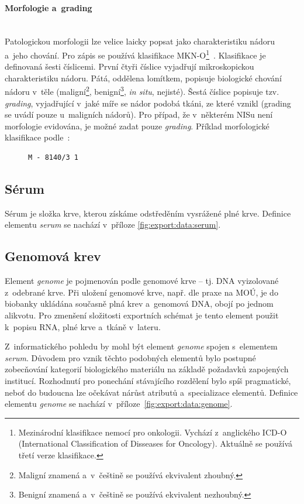\documentclass[11pt, final, oneside]{fithesis2}
\newcommand{\paragraphNewLine}[1]{\paragraph*{#1}\mbox{}\\}
\begin{document}
\paragraphNewLine{Morfologie a~grading}
Patologickou morfologii lze velice laicky popsat jako charakteristiku nádoru a~jeho chování. Pro zápis se používá klasifikace MKN-O\footnote{Mezinárodní klasifikace nemocí pro onkologii. Vychází z~anglického ICD-O (International Classification of Disseases for Oncology). Aktuálně se používá třetí verze klasifikace.}~\cite{MKN-O}. Klasifikace je definovaná šesti číslicemi. První čtyři číslice vyjadřují mikroskopickou charakteristiku nádoru. Pátá, oddělena lomítkem, popisuje biologické chování nádoru v~těle (maligní\footnote{Maligní znamená  a~v~češtině se používá ekvivalent zhoubný.}, benigní\footnote{Benigní znamená  a~v~češtině se používá ekvivalent nezhoubný.}, \textit{in situ}, nejisté). Šestá číslice popisuje tzv. \textit{grading}, vyjadřující v~jaké míře se nádor podobá tkáni, ze které vznikl (grading se uvádí pouze u~maligních nádorů). Pro případ, že v~některém NISu není morfologie evidována, je možné zadat pouze \textit{grading}.
Příklad morfologické klasifikace podle~\cite{MKN-O}:

\begin{figure}[ht!] %
\centering
\begin{BVerbatim}
M - 8140/3 1
\end{BVerbatim}
\end{figure}

\subsection{Sérum}
Sérum je složka krve, kterou získáme odstředěním vysrážené plné krve. Definice elementu \textit{serum} se nachází v~příloze \ref{fig:export:data:serum}.

\subsection{Genomová krev}
Element \textit{genome} je pojmenován podle genomové krve -- tj. DNA vyizolované z~odebrané krve. Při uložení genomové krve, např. dle praxe na MOÚ, je do biobanky ukládána současně plná krev a~genomová DNA, obojí po jednom alikvotu.
Pro zmenšení složitosti exportních schémat je tento element použit k~popisu RNA, plné krve a~tkáně v~lateru.

Z~informatického pohledu by mohl být element \textit{genome} spojen s~elementem \textit{serum}. Důvodem pro vznik těchto podobných elementů bylo postupné zobecňování kategorií biologického materiálu na základě požadavků zapojených institucí. Rozhodnutí pro ponechání stávajícího rozdělení bylo spíš pragmatické, neboť do budoucna lze očekávat nárůst atributů a~specializace elementů. Definice elementu \textit{genome} se nachází v~příloze~\ref{fig:export:data:genome}.
\end{document}
